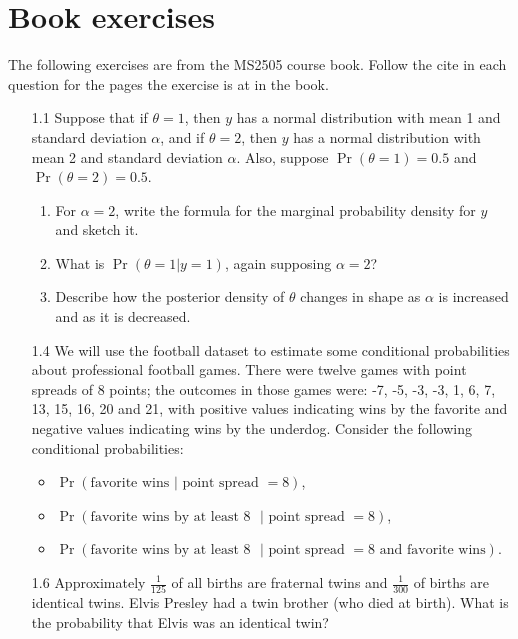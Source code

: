\documentclass[12pt,a4paper,twoside]{article}
\begin{document}
\section{Book exercises}
The following exercises are from the MS2505 course book\cite{CourseBook}. Follow the cite in each question for the pages
the exercise is at in the book.
\begin{enumerate}
    \item[1.1]\cite{Chapter1Exercises} Suppose that if $\theta = 1$, then $y$ has a normal distribution with mean
    1 and standard deviation $\alpha$, and if $\theta = 2$, then $y$ has a normal distribution with mean 2
    and standard deviation $\alpha$. Also, suppose $\Pr(\theta = 1) = 0.5$ and $\Pr(\theta = 2) = 0.5$.
    \begin{enumerate}[label=$\alph*)$]
        \item For $\alpha = 2$, write the formula for the marginal probability density for $y$ and sketch it.
        \item What is $\Pr(\theta = 1|y = 1)$, again supposing $\alpha = 2$?
        \item Describe how the posterior density of $\theta$ changes in shape as $\alpha$ is increased and as it is
        decreased.
    \end{enumerate}
    \item[1.4]\cite{Chapter1Exercises} We will use the football dataset to estimate some conditional probabilities about professional
    football games. There were twelve games with point spreads of 8 points; the outcomes in those games were: -7, -5, -3, -3, 1, 6, 7,
    13, 15, 16, 20 and 21, with positive values indicating wins by the favorite and negative values indicating wins by the underdog.
    Consider the following conditional probabilities:
    \begin{itemize}
        \item $\Pr(\text{favorite wins }|\text{ point spread }= 8)$,
        \item $\Pr(\text{favorite wins by at least }8\text{ }|\text{ point spread }= 8)$,
        \item $\Pr(\text{favorite wins by at least }8\text{ }| \text{ point spread } = 8\text{ and favorite wins})$.
    \end{itemize} 
    \item[1.6]\cite{Chapter1Exercises} Approximately $\frac{1}{125}$ of all births are fraternal twins and $\frac{1}{300}$ of births are
    identical twins. Elvis Presley had a twin brother (who died at birth). What is the probability that Elvis was an identical twin?

\end{enumerate}
\end{document}
